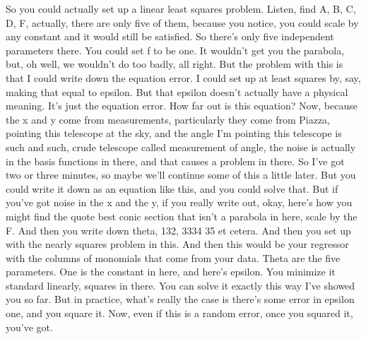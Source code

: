 \documentclass[11pt,a4paper]{article}
\begin{document}
So you could actually set up a linear least squares problem. Listen, find A, B, C, D, F, actually, there are only five of them, because you notice, you could scale by any constant and it would still be satisfied. So there's only five independent parameters there. You could set f to be one. It wouldn't get you the parabola, but, oh well, we wouldn't do too badly, all right. But the problem with this is that I could write down the equation error. I could set up at least squares by, say, making that equal to epsilon. But that epsilon doesn't actually have a physical meaning. It's just the equation error. How far out is this equation? Now, because the x and y come from measurements, particularly they come from Piazza, pointing this telescope at the sky, and the angle I'm pointing this telescope is such and such, crude telescope called measurement of angle, the noise is actually in the basis functions in there, and that causes a problem in there. So I've got two or three minutes, so maybe we'll continue some of this a little later. But you could write it down as an equation like this, and you could solve that. But if you've got noise in the x and the y, if you really write out, okay, here's how you might find the quote best conic section that isn't a parabola in here, scale by the F. And then you write down theta, 132, 3334 35 et cetera. And then you set up with the nearly squares problem in this. And then this would be your regressor with the columns of monomials that come from your data. Theta are the five parameters. One is the constant in here, and here's epsilon. You minimize it standard linearly, squares in there. You can solve it exactly this way I've showed you so far. But in practice, what's really the case is there's some error in epsilon one, and you square it. Now, even if this is a random error, once you squared it, you've got.
\end{document}
